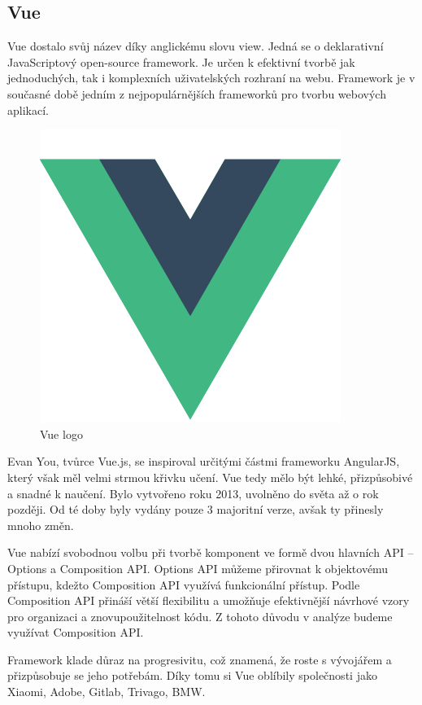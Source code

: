 \subsection{Vue}


Vue dostalo svůj název díky anglickému slovu view. Jedná se o deklarativní JavaScriptový open-source framework. 
Je určen k efektivní tvorbě jak jednoduchých, tak i komplexních uživatelských rozhraní na webu. 
Framework je v současné době jedním z nejpopulárnějších frameworků pro tvorbu webových aplikací.\cite{vuemacrae,vue}

\begin{figure}[htb]
	\centering
		\includegraphics[width=.3\textwidth]{images/vue-logo.png}
	\caption[Vue logo]{Vue logo \cite{vue}}
	\label{fig:vuelogo}
\end{figure}

Evan You, tvůrce Vue.js, se inspiroval určitými částmi frameworku AngularJS, který však měl velmi strmou křivku učení. 
Vue tedy mělo být lehké, přizpůsobivé a snadné k naučení. Bylo vytvořeno roku 2013, uvolněno do světa až o rok později. 
Od té doby byly vydány pouze 3 majoritní verze, avšak ty přinesly mnoho změn.\cite{vueflexiple,vuemedium}

Vue nabízí svobodnou volbu při tvorbě komponent ve formě dvou hlavních API -- Options a Composition API. 
Options API můžeme přirovnat k objektovému přístupu, kdežto Composition API využívá funkcionální přístup. 
Podle \cite{vue} Composition API přináší větší flexibilitu a umožňuje efektivnější návrhové vzory pro organizaci a znovupoužitelnost kódu. 
Z tohoto důvodu v analýze budeme využívat Composition API.

Framework klade důraz na progresivitu, což znamená, že roste s vývojářem a přizpůsobuje se jeho potřebám. 
Díky tomu si Vue oblíbily společnosti jako Xiaomi, Adobe, Gitlab, Trivago, BMW.\cite{vuetriodev,vue}

